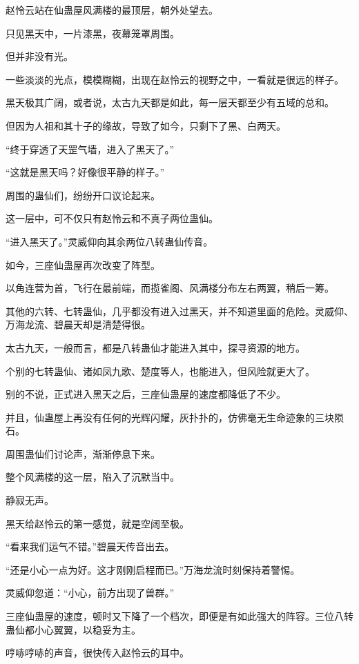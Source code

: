 
\begin{this_body}

赵怜云站在仙蛊屋风满楼的最顶层，朝外处望去。

只见黑天中，一片漆黑，夜幕笼罩周围。

但并非没有光。

一些淡淡的光点，模模糊糊，出现在赵怜云的视野之中，一看就是很远的样子。

黑天极其广阔，或者说，太古九天都是如此，每一层天都至少有五域的总和。

但因为人祖和其十子的缘故，导致了如今，只剩下了黑、白两天。

“终于穿透了天罡气墙，进入了黑天了。”

“这就是黑天吗？好像很平静的样子。”

周围的蛊仙们，纷纷开口议论起来。

这一层中，可不仅只有赵怜云和不真子两位蛊仙。

“进入黑天了。”灵威仰向其余两位八转蛊仙传音。

如今，三座仙蛊屋再次改变了阵型。

以角连营为首，飞行在最前端，而揽雀阁、风满楼分布左右两翼，稍后一筹。

其他的六转、七转蛊仙，几乎都没有进入过黑天，并不知道里面的危险。灵威仰、万海龙流、碧晨天却是清楚得很。

太古九天，一般而言，都是八转蛊仙才能进入其中，探寻资源的地方。

个别的七转蛊仙、诸如凤九歌、楚度等人，也能进入，但风险就更大了。

别的不说，正式进入黑天之后，三座仙蛊屋的速度都降低了不少。

并且，仙蛊屋上再没有任何的光辉闪耀，灰扑扑的，仿佛毫无生命迹象的三块陨石。

周围蛊仙们讨论声，渐渐停息下来。

整个风满楼的这一层，陷入了沉默当中。

静寂无声。

黑天给赵怜云的第一感觉，就是空阔至极。

“看来我们运气不错。”碧晨天传音出去。

“还是小心一点为好。这才刚刚启程而已。”万海龙流时刻保持着警惕。

灵威仰忽道：“小心，前方出现了兽群。”

三座仙蛊屋的速度，顿时又下降了一个档次，即便是有如此强大的阵容。三位八转蛊仙都小心翼翼，以稳妥为主。

哼哧哼哧的声音，很快传入赵怜云的耳中。


\end{this_body}
